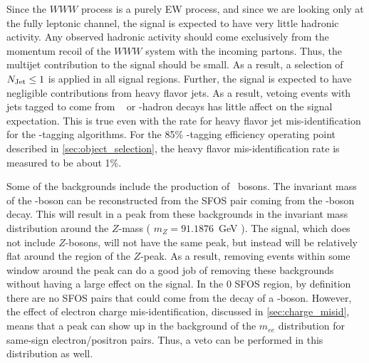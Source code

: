 




Since the $WWW$ process is a purely EW process, and since
we are looking only at the fully leptonic channel, the 
signal is expected to have very little hadronic 
activity. Any observed hadronic activity should come exclusively
from the momentum recoil of the $WWW$ system with the incoming
partons. Thus, the multijet contribution to the signal
should be small. As a result, a selection of $N_{\textrm{Jet}} \leq 1$
is applied in all signal regions.
Further, the signal is 
expected to have negligible contributions
from heavy flavor jets. As a result, vetoing events with jets
tagged to come from \bee~ or \bee-hadron decays has
little affect on the signal expectation. This is true even with 
the rate for heavy flavor jet mis-identification for the 
\bee-tagging algorithms. For the 
85\% \bee-tagging efficiency operating point described in 
\sec\ref{sec:object_selection}, the heavy flavor
mis-identification rate is measured to be about 1\%. %


Some of the backgrounds include the production of \z~bosons.
The invariant mass of the \z-boson can be reconstructed from the SFOS
pair coming from the \z-boson decay. 
This will result in a peak from these backgrounds
in the invariant mass distribution around 
the $Z$-mass ( $m_{Z}=91.1876$~GeV \cite{PDG:2014}).
The signal, which does not include $Z$-bosons, 
will not have the same peak, but instead
will be relatively flat around the region of the $Z$-peak. 
As a result, removing events within some window around the peak can do a good job
of removing these backgrounds without having a large effect on the signal.
In the 0 SFOS region, by definition there are no SFOS pairs that could come 
from the decay of a \z-boson. 
However, the effect of electron charge mis-identification,
discussed in \sec\ref{sec:charge_misid}, means that a 
peak can show up in the background
of the $m_{ee}$ distribution for same-sign electron/positron pairs. 
Thus, a veto can be performed in this distribution as well.


